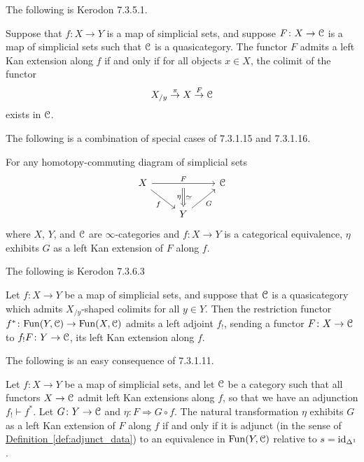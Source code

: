 \documentclass[main.tex]{subfiles}
\begin{document}
The following is Kerodon 7.3.5.1.
\begin{theorem}
  \label{thm:existence_local_left_kan_exts}
  Suppose that $f\colon X \to Y$ is a map of simplicial sets, and suppose $F\colon X \to \mathcal{C}$ is a map of simplicial sets such that $\mathcal{C}$ is a quasicategory. The functor $F$ admits a left Kan extension along $f$ if and only if for all objects $x \in X$, the colimit of the functor
  \begin{equation*}
    X_{/y} \overset{\pi}{\to} X \overset{F}{\to} \mathcal{C}
  \end{equation*}
  exists in $\mathcal{C}$.
\end{theorem}

The following is a combination of special cases of 7.3.1.15 and 7.3.1.16.
\begin{example}
  \label{eg:strictly_commuting_left_kan}
  For any homotopy-commuting diagram of simplicial sets
  \begin{equation*}
    \begin{tikzcd}
      X
      \arrow[dr, swap, "f"]
      \arrow[rr, "F", ""{below, name=M}]
      && \category{C}
      \\
      & Y
      \arrow[ur, swap, "G"]
      \arrow[from=M, Rightarrow, "\simeq", "\eta"{swap}]
    \end{tikzcd}
  \end{equation*}
  where $X$, $Y$, and $\mathcal{C}$ are $\infty$-categories and $f\colon X \to Y$ is a categorical equivalence, $\eta$ exhibits $G$ as a left Kan extension of $F$ along $f$.
\end{example}

The following is Kerodon 7.3.6.3
\begin{theorem}
  \label{thm:existence_global_left_kan_exts}
  Let $f\colon X \to Y$ be a map of simplicial sets, and suppose that $\mathcal{C}$ is a quasicategory which admits $X_{/y}$-shaped colimits for all $y \in Y$. Then the restriction functor $f^{*}\colon \mathrm{Fun}(Y, \mathcal{C}) \to \mathrm{Fun}(X, \mathcal{C})$ admits a left adjoint $f_{!}$, sending a functor $F\colon X \to \mathcal{C}$ to $f_{!}F\colon Y \to \mathcal{C}$, its left Kan extension along $f$.
\end{theorem}

The following is an easy consequence of 7.3.1.11.
\begin{proposition}
  Let $f\colon X \to Y$ be a map of simplicial sets, and let $\mathcal{C}$ be a category such that all functors $X \to \mathcal{C}$ admit left Kan extensions along $f$, so that we have an adjunction $f_{!} \vdash f^{*}$. Let $G\colon Y \to \mathcal{C}$ and $\eta\colon F \Rightarrow G \circ f$. The natural transformation $\eta$ exhibits $G$ as a left Kan extension of $F$ along $f$ if and only if it is adjunct (in the sense of \hyperref[def:adjunct_data]{Definition~\ref*{def:adjunct_data}}) to an equivalence in $\mathrm{Fun}(Y, \mathcal{C})$ relative to $s = \mathrm{id}_{\Delta^{1}}$.
\end{proposition}
\end{document}
